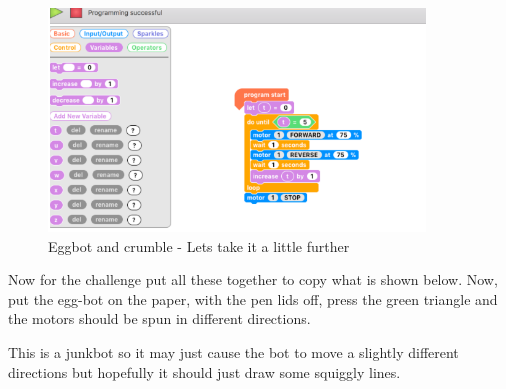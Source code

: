 \begin{figure}
    \centering
    \includegraphics[width=10cm]{chapters/ChapterP1/figures/eggbot_stage10.png}
    \caption{Eggbot and crumble - Lets take it a  little further}
    \label{fig:EgggbotdrawingCrumbleMore2}
\end{figure}

Now for the challenge put all these together to copy what is shown below. Now, put the egg-bot on the paper, with the pen lids off, press the green triangle and the motors should be spun in different directions.
 
This is a junkbot so it may just cause the bot to move a slightly different directions but hopefully it should just draw some squiggly lines.